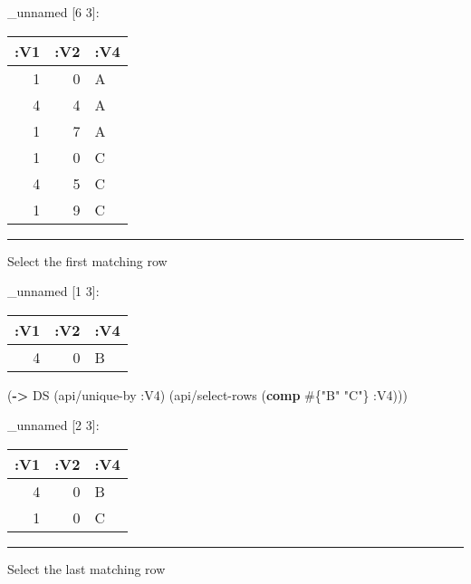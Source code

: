 \documentclass[]{article}
\newenvironment{Shaded}{\begin{snugshade}}{\end{snugshade}}
\newcommand{\KeywordTok}[1]{\textcolor[rgb]{0.13,0.29,0.53}{\textbf{#1}}}
\newcommand{\StringTok}[1]{\textcolor[rgb]{0.31,0.60,0.02}{#1}}
\newcommand{\VariableTok}[1]{\textcolor[rgb]{0.00,0.00,0.00}{#1}}
\newcommand{\AttributeTok}[1]{\textcolor[rgb]{0.77,0.63,0.00}{#1}}
\newcommand{\NormalTok}[1]{#1}
\begin{document}
\_unnamed {[}6 3{]}:

\begin{longtable}[]{@{}rrl@{}}
\toprule
:V1 & :V2 & :V4\tabularnewline
\midrule
\endhead
1 & 0 & A\tabularnewline
4 & 4 & A\tabularnewline
1 & 7 & A\tabularnewline
1 & 0 & C\tabularnewline
4 & 5 & C\tabularnewline
1 & 9 & C\tabularnewline
\bottomrule
\end{longtable}

\begin{center}\rule{0.5\linewidth}{0.5pt}\end{center}

Select the first matching row

\begin{Shaded}
\end{Shaded}

\_unnamed {[}1 3{]}:

\begin{longtable}[]{@{}rrl@{}}
\toprule
:V1 & :V2 & :V4\tabularnewline
\midrule
\endhead
4 & 0 & B\tabularnewline
\bottomrule
\end{longtable}

\begin{Shaded}
\begin{Highlighting}[]
\NormalTok{(}\KeywordTok{->}\NormalTok{ DS}
\NormalTok{    (api/unique-by }\AttributeTok{:V4}\NormalTok{)}
\NormalTok{    (api/select-rows (}\KeywordTok{comp}\NormalTok{ #\{}\StringTok{"B"} \StringTok{"C"}\NormalTok{\} }\AttributeTok{:V4}\NormalTok{)))}
\end{Highlighting}
\end{Shaded}

\_unnamed {[}2 3{]}:

\begin{longtable}[]{@{}rrl@{}}
\toprule
:V1 & :V2 & :V4\tabularnewline
\midrule
\endhead
4 & 0 & B\tabularnewline
1 & 0 & C\tabularnewline
\bottomrule
\end{longtable}

\begin{center}\rule{0.5\linewidth}{0.5pt}\end{center}

Select the last matching row
\end{document}
